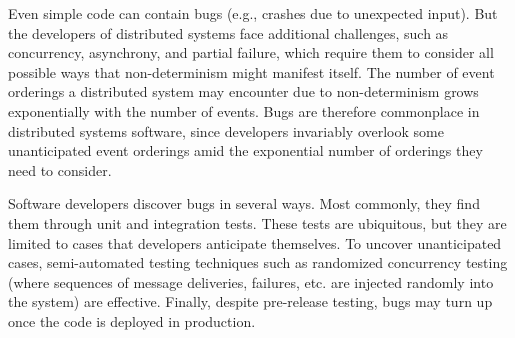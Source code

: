 
Even simple code can contain bugs (e.g., crashes due to unexpected input). But the developers
of distributed systems face
additional challenges, such as concurrency, asynchrony, and partial failure, which require them to
consider all possible ways that non-determinism might manifest itself.
The number of event orderings %
a distributed system may encounter due to non-determinism grows exponentially with the number of
events. Bugs are therefore commonplace in distributed systems software, since developers invariably
overlook some unanticipated event orderings amid the exponential number of
orderings they need to consider.




Software developers discover bugs in several ways.
Most commonly, they find them through unit and integration tests. These tests are ubiquitous, but they are limited to cases that developers
anticipate themselves. To uncover unanticipated cases, semi-automated testing
techniques such as randomized concurrency testing (where
sequences of message deliveries, failures, etc. are injected randomly into the system) are effective.
Finally, despite pre-release testing, bugs may turn up once the code is deployed in production.

